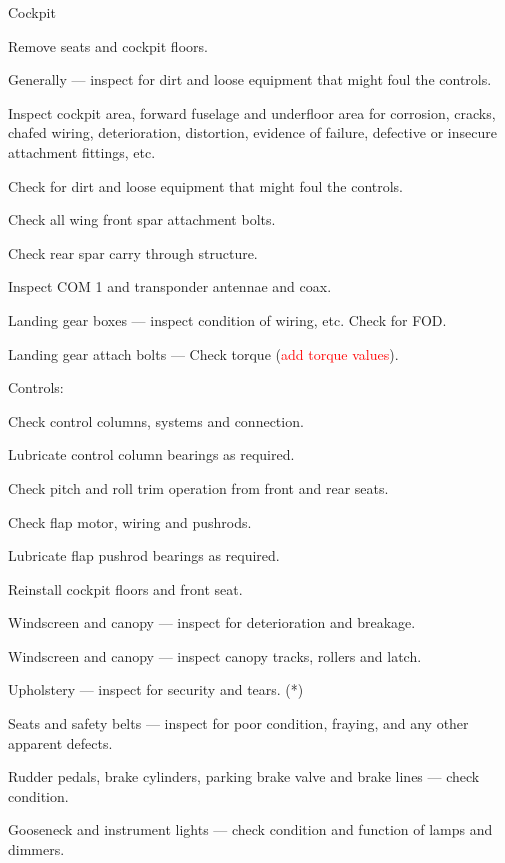 \begin{enumerate*}
	\item{Cockpit} 
	\begin{enumerate*}
		\item Remove seats and cockpit floors. 
		\item Generally --- inspect for dirt and loose equipment that might foul the controls.
		\item Inspect cockpit area, forward fuselage and underfloor area for corrosion, cracks, chafed wiring, deterioration, distortion, evidence of failure, defective or insecure attachment fittings, etc. 
		\item Check for dirt and loose equipment that might foul the controls.
		\item Check all wing front spar attachment bolts.
		\item Check rear spar carry through structure.
		\item Inspect COM 1 and transponder antennae and coax.
		\item Landing gear boxes --- inspect condition of wiring, etc.  Check for FOD.
		\item Landing gear attach bolts --- Check torque (\textcolor{red}{add torque values}). 
		\item Controls:
  	\begin{enumerate*}
  		\item Check control columns, systems and connection.
  		\item Lubricate control column bearings as required.
  		\item Check pitch and roll trim operation from front and rear seats. 
  		\item Check flap motor, wiring and pushrods.
  		\item Lubricate flap pushrod bearings as required.
  	  \end{enumerate*}
		\item Reinstall cockpit floors and front seat. 
		\item Windscreen and canopy --- inspect for deterioration and breakage.
		\item Windscreen and canopy --- inspect canopy tracks, rollers and latch.
		\item Upholstery --- inspect for security and tears. (*)
		\item Seats and safety belts --- inspect for poor condition, fraying, and any other apparent defects.
		\item Rudder pedals, brake cylinders, parking brake valve and brake lines --- check condition.
		\item Gooseneck and instrument lights --- check condition and function of lamps and dimmers.

\end{enumerate*}
\end{enumerate*}
